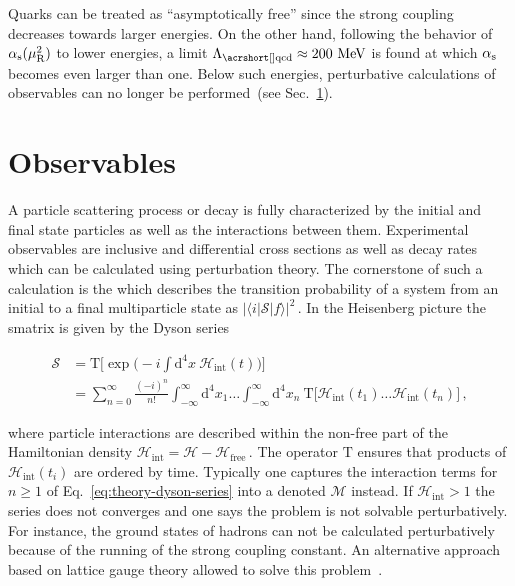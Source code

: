 Quarks can be treated as ``asymptotically free'' since the strong coupling decreases towards larger energies. On the other hand, following the behavior of ${\alpha_\textrm{s}}(\mu^2_\mathrm{R})$ to lower energies, a limit $\Lambda_\mathrm{\gls{qcd}}\approx 200~\MeV$ is found at which ${\alpha_\textrm{s}}$ becomes even larger than one. Below such energies, perturbative calculations of observables can no longer be performed~(see Sec.~\ref{sec:theory-observables}). 





\section{Observables}
\label{sec:theory-observables}

A particle scattering process or decay is fully characterized by the initial and final state particles as well as the interactions between them. Experimental observables are inclusive and differential cross sections as well as decay rates which can be calculated using perturbation theory. The cornerstone of such a calculation is the  which describes the transition probability of a system from an initial to a final multiparticle state as $|\langle i|\mathcal{S}|f\rangle|^{2}\,$. In the Heisenberg picture the \gls{smatrix} is given by the Dyson series

\begin{align}
\mathcal{S}&=\mathrm{T}\Big[\exp\Big(-i\int\mathrm{d}^{4}x~\mathcal{H}_\mathrm{int}(t)\Big)\Big]\nonumber\\
&=\sum_{n=0}^{\infty}\frac{(-i)^{n}}{n!}\int_{-\infty}^{\infty}\mathrm{d}^{4}x_{1}\ldots \int_{-\infty}^{\infty}\mathrm{d}^{4}x_{n}~\mathrm{T}\Big[\mathcal{H}_\mathrm{int}(t_{1})\ldots\mathcal{H}_\mathrm{int}(t_{n})\Big]\,, \label{eq:theory-dyson-series}
\end{align}

where particle interactions are described within the non-free part of the Hamiltonian density $\mathcal{H}_\mathrm{int}=\mathcal{H}-\mathcal{H}_\mathrm{free}\,$. The operator $\mathrm{T}$ ensures that products of $\mathcal{H}_\mathrm{int}(t_{i})$ are ordered by time. Typically one captures the interaction terms for $n\geq1$ of Eq.~\ref{eq:theory-dyson-series} into a  denoted $\mathcal{M}$ instead. If $\mathcal{H}_\mathrm{int}>1$ the series does not converges and one says the problem is not solvable perturbatively. For instance, the ground states of hadrons can not be calculated perturbatively because of the running of the strong coupling constant. An alternative approach based on lattice gauge theory allowed to solve this problem~\cite{Durr:2008zz}.

